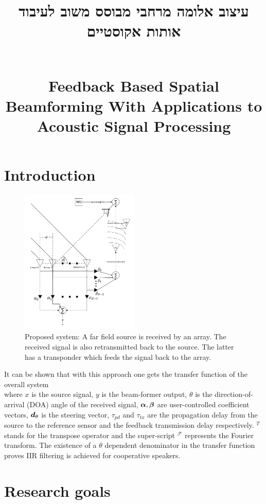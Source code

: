 \documentclass[12pt]{article}
\title{
\begin{otherlanguage}{hebrew}
עיצוב אלומה מרחבי מבוסס משוב לעיבוד אותות אקוסטיים
\end{otherlanguage}
\\
Feedback Based Spatial Beamforming With Applications to Acoustic Signal Processing
}
\begin{document}
\maketitle
\section*{Introduction}


\begin{figure}[!ht]
\begin{center}
\includegraphics[width=0.5\textwidth]{./Media/SpatialIIR-diagram/SpatialIIR_VER4.pdf}
\caption
{
Proposed system: A far field source is received by an array. 
The received signal is also retransmitted back to the source. 
The latter has a transponder which feeds the signal back to the array.
}
\label{fig:SignalModel}
\end{center}
\end{figure}
It can be shown that with this approach one gets the transfer function of the overall system
$$

$$
where $ x $ is the source signal, $ y $ is the beam-former output, $ \theta $ is the direction-of-arrival (DOA) angle of the received signal, $ \vecnot{\alpha},\vecnot{\beta} $ are user-controlled coefficient vectors, $\vecnot{d}_{\theta}$ is the steering vector, $ \tau_{pd}$ and $ \tau_{tx} $ are the propagation delay from the source to the reference sensor and the feedback transmission delay respectively.
$^{T}$ stands for the transpose operator and the super-script $ ^{\mathcal{F}} $ represents the Fourier transform. 
The existence of a $ \theta $ dependent denominator in the transfer function proves IIR filtering is achieved for cooperative speakers.
\section*{Research goals}

\small
{


}
\end{document}

